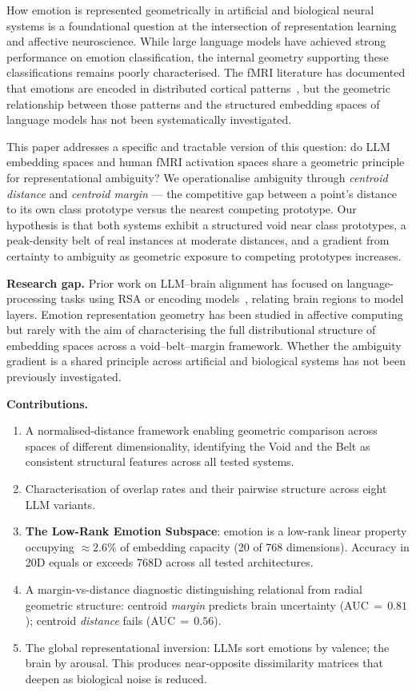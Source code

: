 \documentclass{article}
\begin{document}
How emotion is represented geometrically in artificial and biological neural systems is
a foundational question at the intersection of representation learning and affective
neuroscience. While large language models have achieved strong performance on emotion
classification, the internal geometry supporting these classifications remains poorly
characterised. The fMRI literature has documented that emotions are encoded in
distributed cortical patterns~\citep{horikawa2020}, but the geometric relationship
between those patterns and the structured embedding spaces of language models has not
been systematically investigated.

This paper addresses a specific and tractable version of this question: do LLM embedding
spaces and human fMRI activation spaces share a geometric principle for representational
ambiguity? We operationalise ambiguity through \emph{centroid distance} and
\emph{centroid margin} --- the competitive gap between a point's distance to its own class
prototype versus the nearest competing prototype. Our hypothesis is that both systems
exhibit a structured void near class prototypes, a peak-density belt of real instances
at moderate distances, and a gradient from certainty to ambiguity as geometric exposure
to competing prototypes increases.

\textbf{Research gap.}
Prior work on LLM--brain alignment has focused on language-processing tasks using RSA
or encoding models~\citep{caucheteux2022,schrimpf2021,li2023b,huth2016,li2023a},
relating brain regions to model layers.
Emotion representation geometry has been studied in affective
computing~\citep{russell1980,koelstra2012} but rarely with the aim of characterising
the full distributional structure of embedding spaces across a void--belt--margin
framework. Whether the ambiguity gradient is a shared principle across artificial and
biological systems has not been previously investigated.

\textbf{Contributions.}
\begin{enumerate}
  \item A normalised-distance framework enabling geometric comparison across spaces of
        different dimensionality, identifying the Void and the Belt as consistent
        structural features across all tested systems.
  \item Characterisation of overlap rates and their pairwise structure across eight
        LLM variants.
  \item \textbf{The Low-Rank Emotion Subspace}: emotion is a low-rank linear property
        occupying $\approx\!2.6\%$ of embedding capacity (20 of 768 dimensions).
        Accuracy in 20D equals or exceeds 768D across all tested architectures.
  \item A margin-vs-distance diagnostic distinguishing relational from radial geometric
        structure: centroid \emph{margin} predicts brain uncertainty
        (AUC$\,{=}\,0.81$); centroid \emph{distance} fails (AUC$\,{=}\,0.56$).
  \item The global representational inversion: LLMs sort emotions by valence; the brain
        by arousal. This produces near-opposite dissimilarity matrices that deepen as
        biological noise is reduced.
\end{enumerate}
\end{document}
